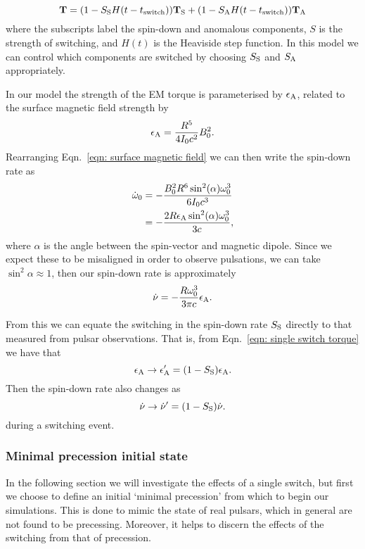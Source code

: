 \documentclass[../full_thesis/full_thesis.tex]{subfiles}
\begin{document}
\begin{equation}
\mathbf{T} = (1 - S_{\mathrm{S}} H(t-t_{\mathrm{switch}})) \mathbf{T}_{\mathrm{S}}+
                 (1 - S_{\mathrm{A}} H(t-t_{\mathrm{switch}})) \mathbf{T}_{\mathrm{A}}
\label{eqn: single switch torque}
\end{equation}
where the subscripts label the spin-down and anomalous components, $S$ is the
strength of switching, and $H(t)$ is the Heaviside step function. In this model
we can control which components are switched by choosing $S_{\mathrm{S}}$ and $S_{\mathrm{A}}$
appropriately.

In our model the strength of the EM torque is parameterised
by $\epsilon_{\mathrm{A}}$, related to the surface magnetic field strength by
\begin{align}
    \epsilon_{\mathrm{A}} = \frac{R^{5}}{4I_{0} c^{2}} B_{0}^{2}.
\end{align}
Rearranging Eqn.~\eqref{eqn: surface magnetic field} we can then write the
spin-down rate as
\begin{align}
\begin{split}
    \dot{\omega}_{0} & = -\frac{B_{0}^{2}R^{6} \sin^{2}(\alpha) \omega_{0}^{3}}{6 I_{0} c^{3}} \\
    & = - \frac{2 R \epsilon_{\mathrm{A}} \sin^{2}(\alpha) \omega_{0}^{3}}{3 c},
\end{split}
\end{align}
where $\alpha$ is the angle between the spin-vector and magnetic dipole. Since
we expect these to be misaligned in order to observe pulsations, we can take
$\sin^{2}\alpha \approx 1$, then our spin-down rate is approximately
\begin{equation}
    \dot{\nu} = - \frac{R\omega_{0}^{3}}{3\pi c}\epsilon_{\mathrm{A}}.
    \label{eqn: spin-down of epsA}
\end{equation}

From this we can equate the switching in the spin-down rate $S_{\mathrm{S}}$ directly to
that measured from pulsar observations. That is, from Eqn.~\eqref{eqn: single switch torque}
we have that
\begin{equation}
    \epsilon_{\mathrm{A}} \rightarrow \epsilon_{\mathrm{A}}' = (1-S_{\mathrm{S}})\epsilon_{\mathrm{A}}.
\label{eqn: epsA switch}
\end{equation}
Then the spin-down rate also changes as
\begin{equation}
    \dot{\nu} \rightarrow \dot{\nu}' = (1-S_{\mathrm{S}})\dot{\nu}.
\label{eqn: nudot switch}
\end{equation}
during a switching event.

\subsubsection{Minimal precession initial state}
In the following section we will investigate the effects of a single switch, but
first we choose to define an initial `minimal precession' from which to begin
our simulations. This is done to mimic the state of real pulsars, which in
general are not found to be precessing. Moreover, it helps to discern the
effects of the switching from that of precession.
\end{document}
